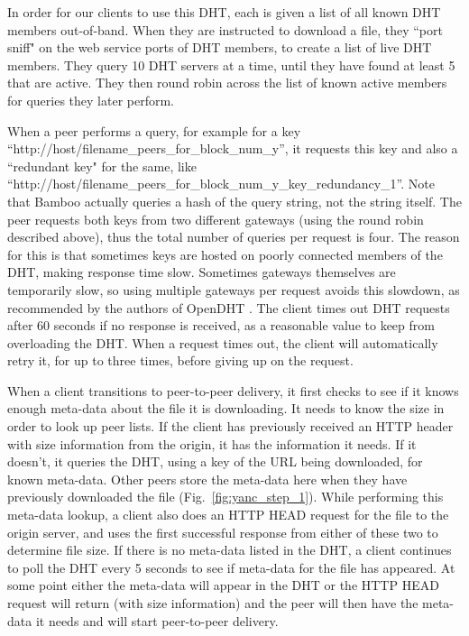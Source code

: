 In order for our clients to use this DHT, each is given a list of all known DHT members out-of-band.  When they are instructed to download a file, 
they ``port sniff" on the web service ports of DHT members, to create a list of live DHT members.  
They query 10 DHT servers at a time, until they have found at least 5 that are active.
They then round robin across the list of known active members for queries they later perform.

When a peer performs a query, for example for a key ``http://host/filename\_peers\_for\_block\_num\_y'', it requests this key and also a ``redundant key" for the same, 
like ``http://host/filename\_peers\_for\_block\_num\_y\_key\_redundancy\_1''.  Note that Bamboo actually queries a hash of the query string, not the string itself.  
The peer requests both keys from two different gateways (using the round robin described above), 
thus the total number of queries per request is four.
The reason for this is that sometimes keys are hosted on poorly connected members of the DHT, making response time slow.
Sometimes gateways themselves are temporarily slow, so using multiple gateways per request avoids this slowdown, as recommended by the authors of OpenDHT \cite{opendht_embarrassing}.
The client times out DHT requests after 60 seconds if no response is received, as a reasonable value to keep from 
overloading the DHT.  When a request times out, the client will automatically retry it, for up to three times, before giving up on the request.

When a client transitions to peer-to-peer delivery, it first checks to see if it knows enough meta-data about the file it is downloading.  
It needs to know the size in order to look up peer lists.
If the client has previously received an HTTP header with size information from the origin, it has the information it needs.  If it doesn't, it
queries the DHT, using a key of the URL being downloaded, for known meta-data.  
Other peers store the meta-data here when they have previously downloaded the file (Fig.~\ref{fig:yanc_step_1}). 
While performing this meta-data lookup, a client also does an HTTP HEAD request for the file to the origin server, 
and uses the first successful response from either of these two to determine file size.  
If there is no meta-data listed in the DHT, a client continues to poll the DHT every 5 seconds to see if meta-data for the file has appeared.  At some point
either the meta-data will appear in the DHT or the HTTP HEAD request will return (with size information) and the peer will then have the meta-data 
it needs and will start  peer-to-peer delivery.

